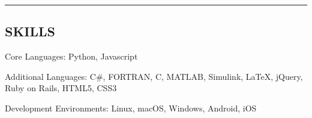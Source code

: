 \documentclass[letterpaper,MMMyyyy,nonstop]{simpleresumecv}
\newenvironment{indentsection}[1]%
{\begin{list}{}%
    {\setlength{\leftmargin}{#1}}%
    \item[]%
}
{\end{list}}
\newcommand{\CPP}
{C\nolinebreak[4]\hspace{-.05em}\raisebox{.22ex}{\footnotesize\bf ++}}
\begin{document}


% 






\hrule
\vspace{-0.4em}
\subsection*{SKILLS}

\begin{indentsection}{\parindent}
    \begin{description*}
        \item[Core Languages:]
        Python, Javascript
        \item[Additional Languages:]
        C\#, FORTRAN, \CPP, MATLAB, Simulink, \LaTeX, jQuery, Ruby on Rails, HTML5, CSS3
        \item[Development Environments:]
        Linux, macOS, Windows, Android, iOS
    \end{description*}
\end{indentsection}

\end{document}
